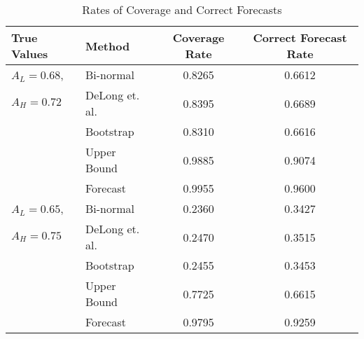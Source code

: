 


\begin{table}[h!]

\begin{center}

    \caption{Rates of Coverage and Correct Forecasts} \label{fig:Coverage1}

    \begin{tabular}{l l c c }

    True Values & Method & Coverage Rate & Correct Forecast Rate \\

    \hline


$A_L = 0.68$, &
          Bi-normal &  0.8265 & 0.6612 \\
$A_H = 0.72$ &
     DeLong et. al. &  0.8395 & 0.6689 \\
 &         Bootstrap &  0.8310 & 0.6616 \\
 &       Upper Bound &  0.9885 & 0.9074 \\
 &          Forecast &  0.9955 & 0.9600 \\


    \hline


$A_L = 0.65$, &
          Bi-normal &  0.2360 & 0.3427 \\
$A_H = 0.75$ &
     DeLong et. al. &  0.2470 & 0.3515 \\
 &         Bootstrap &  0.2455 & 0.3453 \\
 &       Upper Bound &  0.7725 & 0.6615 \\
 &          Forecast &  0.9795 & 0.9259 \\



\end{tabular}
\end{center}
\end{table}

